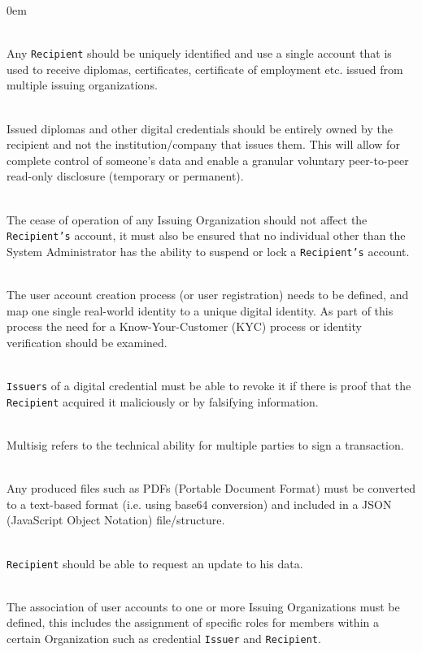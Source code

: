 \begin{description}
	\itemsep0em
	\item[RQ8] \hfill \\ Any \texttt{Recipient} should be uniquely identified and use a single account that is used to receive diplomas, certificates, certificate of employment etc. issued from multiple issuing organizations.
	
	\item[RQ9] \hfill \\ Issued diplomas and other digital credentials should be entirely owned by the recipient and not the institution/company that issues them. This will allow for complete control of someone's data and enable a granular voluntary peer-to-peer read-only disclosure (temporary or permanent).
	
	\item[RQ10] \hfill \\ The cease of operation of any Issuing Organization should not affect the \texttt{Recipient's} account, it must also be ensured that no individual other than the System Administrator has the ability to suspend or lock a \texttt{Recipient's} account.
	
	\item[RQ11] \hfill \\ The user account creation process (or user registration) needs to be defined, and map one single real-world identity to a unique digital identity. As part of this process the need for a Know-Your-Customer (KYC) process or identity verification should be examined.
	
	\item[RQ12] \hfill \\ \texttt{Issuers} of a digital credential must be able to revoke it if there is proof that the \texttt{Recipient} acquired it maliciously or by falsifying information.
	
	\item[RQ16] \hfill \\
	Multisig refers to the technical ability for multiple parties to sign a transaction.
	
	\item[RQ17] \hfill \\ Any produced files such as PDFs (Portable Document Format) must be converted to a text-based format (i.e. using base64 conversion) and included in a JSON (JavaScript Object Notation) file/structure.
	
	\item[RQ18] \hfill \\ \texttt{Recipient} should be able to request an update to his data.
	
	\item[RQ20] \hfill \\ The association of user accounts to one or more Issuing Organizations must be defined, this includes the assignment of specific roles for members within a certain Organization such as credential \texttt{Issuer} and \texttt{Recipient}.
\end{description}



